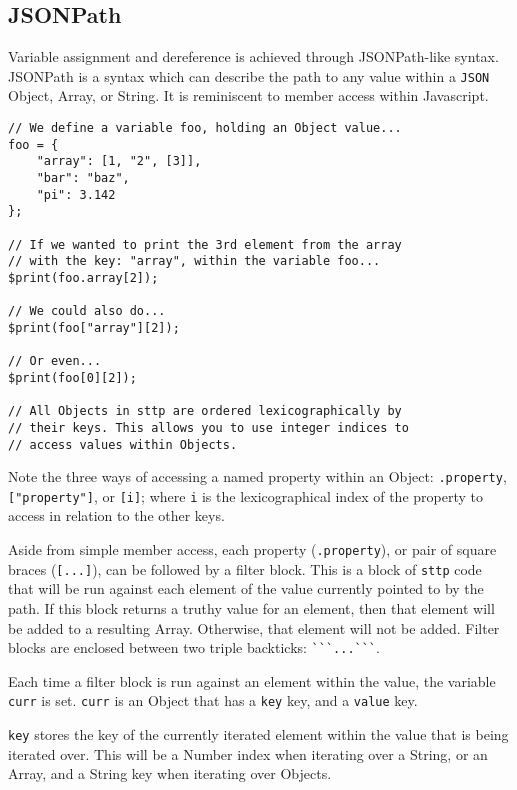 \subsection{JSONPath}

Variable assignment and dereference is achieved through JSONPath-like syntax. JSONPath is a syntax which can describe the path to any value within a \verb|JSON| Object, Array, or String. It is reminiscent to member access within Javascript.

\begin{verbatim}
// We define a variable foo, holding an Object value...
foo = {
    "array": [1, "2", [3]],
    "bar": "baz",
    "pi": 3.142
};

// If we wanted to print the 3rd element from the array
// with the key: "array", within the variable foo...
$print(foo.array[2]);

// We could also do...
$print(foo["array"][2]);

// Or even...
$print(foo[0][2]);

// All Objects in sttp are ordered lexicographically by
// their keys. This allows you to use integer indices to
// access values within Objects.
\end{verbatim}

Note the three ways of accessing a named property within an Object: \verb|.property|, \verb|["property"]|, or \verb|[i]|; where \verb|i| is the lexicographical index of the property to access in relation to the other keys.

\label{sec:hello-sttp-jsonpath-filter}

Aside from simple member access, each property (\verb|.property|), or pair of square braces (\verb|[...]|), can be followed by a filter block. This is a block of \verb|sttp| code that will be run against each element of the value currently pointed to by the path. If this block returns a truthy value for an element, then that element will be added to a resulting Array. Otherwise, that element will not be added. Filter blocks are enclosed between two triple backticks: \verb|```...```|.

Each time a filter block is run against an element within the value, the variable \verb|curr| is set. \verb|curr| is an Object that has a \verb|key| key, and a \verb|value| key.

\verb|key| stores the key of the currently iterated element within the value that is being iterated over. This will be a Number index when iterating over a String, or an Array, and a String key when iterating over Objects.

